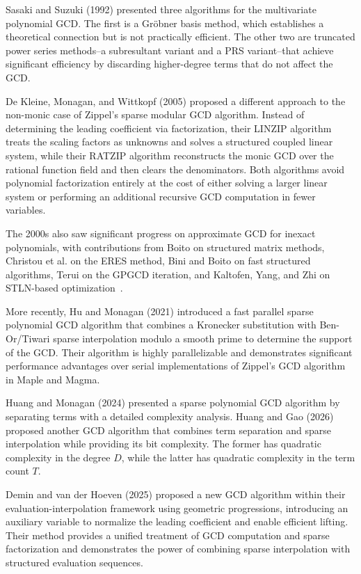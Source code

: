 \documentclass{article}
\numberwithin{equation}{section}
\begin{document}
Sasaki and Suzuki (1992) \cite{sasaki1992three} presented three algorithms for the multivariate polynomial GCD. The first is a Gr\"obner basis method, which establishes a theoretical connection but is not practically efficient. The other two are truncated power series methods--a subresultant variant and a PRS variant--that achieve significant efficiency by discarding higher-degree terms that do not affect the GCD.


De Kleine, Monagan, and Wittkopf (2005) \cite{dekleine2005} proposed a different approach to the non-monic case of Zippel's sparse modular GCD algorithm. Instead of determining the leading coefficient via factorization, their LINZIP algorithm treats the scaling factors as unknowns and solves a structured coupled linear system, while their RATZIP algorithm reconstructs the monic GCD over the rational function field and then clears the denominators. Both algorithms avoid polynomial factorization entirely at the cost of either solving a larger linear system or performing an additional recursive GCD computation in fewer variables.

The 2000s also saw significant progress on approximate GCD for inexact polynomials, with contributions from Boito on structured matrix methods, Christou et al. on the ERES method, Bini and Boito on fast structured algorithms, Terui on the GPGCD iteration, and Kaltofen, Yang, and Zhi on STLN-based optimization~\cite{boito2011structured,christou2010eres,bini2010fast,terui2010gpgcd,kaltofen2006approximate}.

More recently, Hu and Monagan (2021) \cite{HuMonagan2021} introduced a fast parallel sparse polynomial GCD algorithm that combines a Kronecker substitution with Ben-Or/Tiwari sparse interpolation modulo a smooth prime to determine the support of the GCD. Their algorithm is highly parallelizable and demonstrates significant performance advantages over serial implementations of Zippel's GCD algorithm in Maple and Magma.


Huang and Monagan (2024) \cite{HuangMonagan2024} presented a sparse polynomial GCD algorithm by separating terms with a detailed complexity analysis. Huang and Gao (2026) \cite{HuangGao2025} proposed another GCD algorithm that combines term separation and sparse interpolation while providing its bit complexity. The former has quadratic complexity in the degree $D$, while the latter has quadratic complexity in the term count $T$.

Demin and van der Hoeven (2025) \cite{DeminHoeven2025} proposed a new GCD algorithm within their evaluation-interpolation framework using geometric progressions, introducing an auxiliary variable to normalize the leading coefficient and enable efficient lifting. Their method provides a unified treatment of GCD computation and sparse factorization and demonstrates the power of combining sparse interpolation with structured evaluation sequences.
\end{document}
